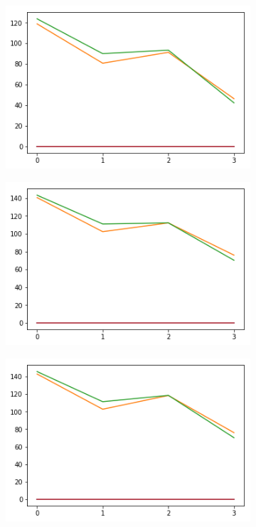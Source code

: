\begin{figure}[h!]
  \begin{subfigure}[b]{0.3\linewidth}
    \includegraphics[width=\linewidth]{images/subst1/ef0_means_pos.png}
    \caption{}
  \end{subfigure}
  \begin{subfigure}[b]{0.3\linewidth}
    \includegraphics[width=\linewidth]{images/subst1/ef1_means_pos.png}
    \caption{}
  \end{subfigure}
  \begin{subfigure}[b]{0.3\linewidth}
    \includegraphics[width=\linewidth]{images/subst1/ef2_means_pos.png}
    \caption{}
  \end{subfigure}
    

\end{figure}
